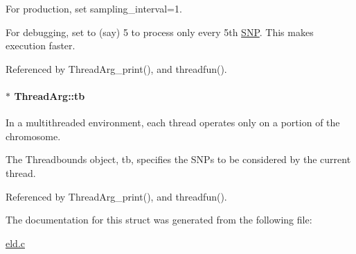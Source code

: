 \-For production, set sampling\-\_\-interval=1. 

\-For debugging, set to (say) 5 to process only every 5th \hyperlink{struct_s_n_p}{\-S\-N\-P}. \-This makes execution faster. 

\-Referenced by \-Thread\-Arg\-\_\-print(), and threadfun().

\hypertarget{struct_thread_arg_ac4848e29e694d7a9c5b0b09896cc3f37}{
\paragraph[{tb}]{$\ast$ {\bf \-Thread\-Arg\-::tb}}}\label{struct_thread_arg_ac4848e29e694d7a9c5b0b09896cc3f37}


\-In a multithreaded environment, each thread operates only on a portion of the chromosome. 

\-The \-Threadbounds object, tb, specifies the \-S\-N\-Ps to be considered by the current thread. 

\-Referenced by \-Thread\-Arg\-\_\-print(), and threadfun().



\-The documentation for this struct was generated from the following file\-:\begin{DoxyCompactItemize}
\item 
\hyperlink{eld_8c}{eld.\-c}\end{DoxyCompactItemize}
